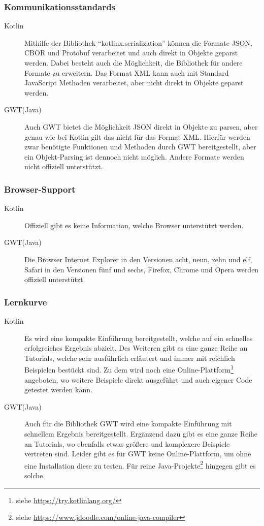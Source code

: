 \subsubsection{Kommunikationsstandards}
\begin{description}
	\item[Kotlin] Mithilfe der Bibliothek \enquote{kotlinx.serialization} können die Formate \gls{JSON}, \gls{CBOR} und \gls{Protobuf} verarbeitet und auch direkt in Objekte geparst werden.
	Dabei besteht auch die Möglichkeit, die Bibliothek für andere Formate zu erweitern. Das Format \gls{XML} kann auch mit Standard JavaScript Methoden verarbeitet, aber nicht direkt in Objekte geparst werden. \cite{kotlinxSerialization}
	\item[GWT(Java)] Auch \gls{GWT} bietet die Möglichkeit \gls{JSON} direkt in Objekte zu parsen, aber genau wie bei Kotlin gilt das nicht für das Format \gls{XML}. Hierfür werden zwar benötigte Funktionen und Methoden durch \gls{GWT} bereitgestellt, aber ein Objekt-Parsing ist dennoch nicht möglich. Andere Formate werden nicht offiziell unterstützt. \cite{gwtJSON, gwtXML}
\end{description}

\subsubsection{Browser-Support}
\begin{description}
	\item[Kotlin] Offiziell gibt es keine Information, welche Browser unterstützt werden.
	\item[GWT(Java)] Die Browser Internet Explorer in den Versionen acht, neun, zehn und elf, Safari in den Versionen fünf und sechs, Firefox, Chrome und Opera werden offiziell unterstützt. \cite{gwtGettingStarted}
\end{description}

\subsubsection{Lernkurve}
\begin{description}
	\item[Kotlin] Es wird eine kompakte Einführung bereitgestellt, welche auf ein schnelles erfolgreiches Ergebnis abzielt. Des Weiteren gibt es eine ganze Reihe an Tutorials, welche sehr ausführlich erläutert und immer mit reichlich Beispielen bestückt sind. Zu dem wird noch eine Online-Plattform\footnote{siehe \url{https://try.kotlinlang.org/}} angeboten, wo weitere Beispiele direkt ausgeführt und auch eigener Code getestet werden kann. \cite{kotlinReference}
	\item[GWT(Java)] Auch für die Bibliothek \gls{GWT} wird eine kompakte Einführung mit schnellem Ergebnis bereitgestellt. Ergänzend dazu gibt es eine ganze Reihe an Tutorials, wo ebenfalls etwas größere und komplexere Beispiele vertreten sind. Leider gibt es für \gls{GWT} keine Online-Plattform, um ohne eine Installation diese zu testen. Für reine Java-Projekte\footnote{siehe \url{https://www.jdoodle.com/online-java-compiler}} hingegen gibt es solche.
\end{description}



